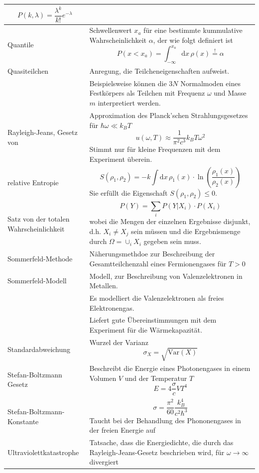 \documentclass{article}
\newcommand{\diff}{\mathrm{d}}
\newcommand{\lr}[1]{\left(#1\right)}
\begin{document}
\begin{xltabular}{\linewidth}{p{6cm}|X}
			$$P(k,\lambda) = \frac{\lambda^k}{k!}e^{-\lambda}$$ \\
	\hline
		Quantile & Schwellenwert $x_a$ für eine bestimmte kummulative Wahrscheinlichkeit $\alpha$, der wie folgt definiert ist
			$$P(x<x_a) = \int_{-\infty}^{x_a} \diff x\, \rho(x) \stackrel{!}{=} \alpha$$ \\
	\hline
		Quasiteilchen & Anregung, die Teilcheneigenschaften aufweist.\\
		& Beispielsweise können die $3N$ Normalmoden eines Festkörpers als Teilchen mit Frequenz $\omega$ und Masse $m$ interpretiert werden. \\
	\hline
		Rayleigh-Jeans, Gesetz von & Approximation des Planck'schen Strahlungsgesetzes für $\hbar\omega\ll k_B T$
			$$u(\omega, T) \approx \frac{1}{\pi^2 c^3} k_B T \omega^2$$
		Stimmt nur für kleine Frequenzen mit dem Experiment überein. \\
	\hline
		relative Entropie & $$S(\rho_1, \rho_2) = -k \int \diff x\, \rho_1(x)\cdot \ln\lr{\frac{\rho_1(x)}{\rho_2(x)}}$$
		Sie erfüllt die Eigenschaft $S(\rho_1,\rho_2)\leq 0$. \\
	\hline
		Satz von der totalen Wahrscheinlichkeit & $$P(Y) = \sum_i P(Y|X_i)\cdot P(X_i)$$ 
		wobei die Mengen der einzelnen Ergebnisse disjunkt, d.h. $X_i \neq X_j$ sein müssen und die Ergebnismenge durch $\Omega = \cup_i X_i$ gegeben sein muss. \\
	\hline
		Sommerfeld-Methode & Näherungsmethdoe zur Beschreibung der Gesamtteilchenzahl eines Fermionengases für $T>0$ \\
	\hline
		Sommerfeld-Modell & Modell, zur Beschreibung von Valenzelektronen in Metallen. \\
		& Es modelliert die Valenzelektronen als freies Elektronengas. \\
		& Liefert gute Übereinstimmungen mit dem Experiment für die Wärmekapazität. \\
	\hline
		Standardabweichung & Wurzel der Varianz
			$$\sigma_X = \sqrt{\text{Var}(X)}$$ \\
	\hline
		Stefan-Boltzmann Gesetz & Beschreibt die Energie eines Photonengases in einem Volumen $V$ und der Temperatur $T$
			$$E = 4\frac{\sigma}{c} V T^4$$ \\
	\hline
		Stefan-Boltzmann-Konstante & $$\sigma = \frac{\pi^2}{60} \frac{k_B^4}{c^2\hbar^3}$$
		Taucht bei der Behandlung des Phononengases in der freien Energie auf \\
	\hline
		Ultraviolettkatastrophe & Tatsache, dass die Energiedichte, die durch das Rayleigh-Jeans-Gesetz beschrieben wird, für $\omega\to\infty$ divergiert \\

\end{xltabular}
\end{document}
